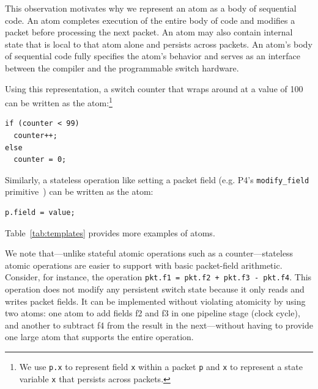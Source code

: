 This observation motivates why we represent an atom as a body of sequential
code. An atom completes execution of the entire body of code and modifies a
packet before processing the next packet.  An atom may also contain internal
state that is local to that atom alone and persists across packets. An atom's
body of sequential code fully specifies the atom's behavior and serves as an
interface between the compiler and the programmable switch hardware.

Using this representation, a switch counter that wraps around at a
value of 100 can be written as the atom:\footnote{We use {\tt p.x} to
  represent field {\tt x} within a packet {\tt p} and {\tt x} to
  represent a state variable {\tt x} that persists across packets.}
\begin{lstlisting}[style=customc, numbers=none, frame=none]
if (counter < 99)
  counter++;
else
  counter = 0;
\end{lstlisting}
Similarly, a stateless operation like setting a packet field
(e.g. P4's {\tt modify\_field} primitive~\cite{p4spec}) can be written
as the atom:
\begin{lstlisting}[style=customc, numbers=none, frame=none]
  p.field = value;
\end{lstlisting}
Table~\ref{tab:templates} provides more examples of atoms.

We note that---unlike stateful atomic operations such as a counter---stateless
atomic operations are easier to support with basic packet-field arithmetic.
Consider, for instance, the operation {\tt pkt.f1 = pkt.f2 + pkt.f3 - pkt.f4}.
This operation does not modify any persistent switch state because it only
reads and writes packet fields. It can be implemented without violating
atomicity by using two atoms: one atom to add fields f2 and f3 in one pipeline
stage (clock cycle), and another to subtract f4 from the result in the
next---without having to provide one large atom that supports the entire
operation.


